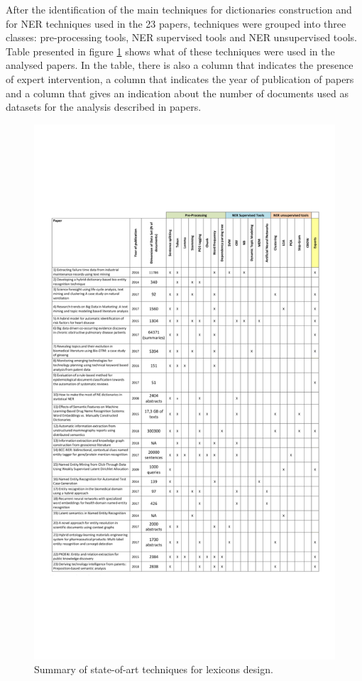 \documentclass[b5paper,]{book}
\theoremstyle{definition}
\theoremstyle{definition}
\theoremstyle{definition}
\theoremstyle{remark}
\begin{document}
After the identification of the main techniques for dictionaries
construction and for NER techniques used in the 23 papers, techniques
were grouped into three classes: pre-processing tools, NER supervised
tools and NER unsupervised tools. Table presented in figure
\ref{fig:lexdesign} shows what of these techniques were used in the
analysed papers. In the table, there is also a column that indicates the
presence of expert intervention, a column that indicates the year of
publication of papers and a column that gives an indication about the
number of documents used as datasets for the analysis described in
papers.

\begin{figure}

{\centering \includegraphics[width=0.8\linewidth]{_bookdown_files/figures/final_lexicon} 

}

\caption{Summary of state-of-art techniques for lexicons design.}\label{fig:lexdesign}
\end{figure}
\end{document}
